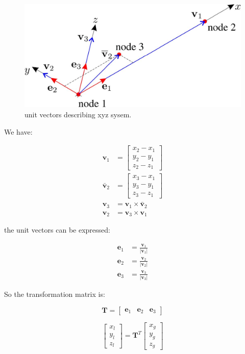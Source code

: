 \begin{figure}[h!]
\centering
\includegraphics[width=0.5\linewidth]{figure/unit_vectors_for_transformation}
\caption{unit vectors describing xyz sysem.}
\label{fig: unit vectors for transformation}
\end{figure}

We have:

\begin{align*}
	\mathbf{v}_1 &= \begin{bmatrix}
		x_2-x_1 \\ 
		y_2-y_1 \\ 
		z_2-z_1
		\end{bmatrix} \\
		 \bar{\mathbf{v}}_2 &= \begin{bmatrix}
		x_3-x_1 \\ 
		y_3-y_1 \\ 
		z_3-z_1 
	\end{bmatrix} \\
	 \mathbf{v}_3 &= \mathbf{v}_1 \times \bar{\mathbf{v}}_2 \\
	 \mathbf{v}_2 &= \mathbf{v}_3 \times \mathbf{v}_1
\end{align*}

the unit vectors can be expressed:

\begin{align*}
	\mathbf{e}_1 &= \frac{\mathbf{v}_1}{|\mathbf{v}_1|} \\
	\mathbf{e}_2 &= \frac{\mathbf{v}_2}{|\mathbf{v}_2|} \\
	\mathbf{e}_3 &= \frac{\mathbf{v}_3}{|\mathbf{v}_3|}
\end{align*}

So the transformation matrix is:

\begin{equation}
\mathbf{T} = \begin{bmatrix}
\mathbf{e}_1 & \mathbf{e}_2 & \mathbf{e}_3
\end{bmatrix} 
\end{equation}

\begin{equation}
\begin{bmatrix}
x_l \\ 
y_l \\ 
z_l
\end{bmatrix} = \mathbf{T}^T \begin{bmatrix}
x_g \\ 
y_g \\ 
z_g
\end{bmatrix} 
\end{equation}

